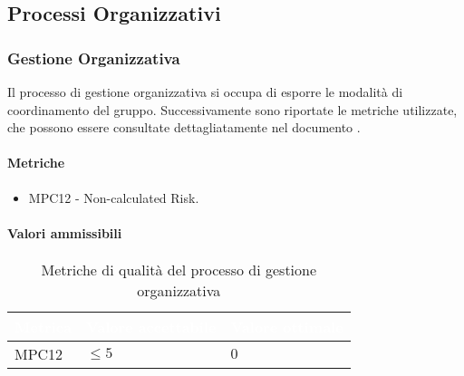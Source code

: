 \subsection{Processi Organizzativi}
\subsubsection{Gestione Organizzativa}
Il processo di gestione organizzativa si occupa di esporre le modalità di coordinamento del gruppo. Successivamente sono riportate le metriche utilizzate, che possono essere consultate dettagliatamente nel documento .
\paragraph{Metriche}
\begin{itemize}
	\item MPC12 - Non-calculated Risk.
\end{itemize}

\paragraph{Valori ammissibili}
{
\renewcommand{\arraystretch}{1.5}
\centering
\begin{longtable}{C{2.5cm} C{4cm} C{4cm}}
\textcolor{white}{\textbf{Metrica}}&
\textcolor{white}{\textbf{Valore accettabile}}&
\textcolor{white}{\textbf{Valore ottimale}}\\	
\endhead
\endfoot
{}\caption{Metriche di qualità del processo di gestione organizzativa}
\endlastfoot

MPC12 & $ \leq 5 $ & $ 0 $ \\
 
\end{longtable}
}